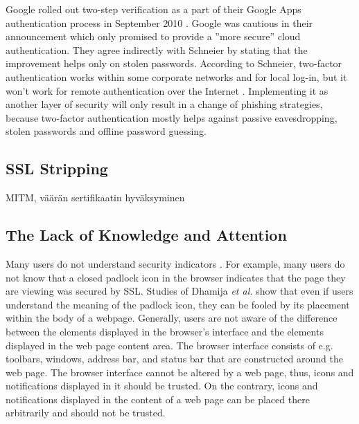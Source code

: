 \documentclass[english,gradu]{tktltiki}
\begin{document}
             Google rolled out two-step verification as a part of their Google Apps authentication process in September 2010 \cite{google_2step_2010}. Google was cautious in their announcement which only promised to provide a ''more secure'' cloud authentication. They agree indirectly with Schneier \cite{schneier_2factor_2005} by stating that the improvement helps only on stolen passwords. According to Schneier, two-factor authentication works within some corporate networks and for local log-in, but it won't work for remote authentication over the Internet \cite{schneier_2factor_2005}. Implementing it as another layer of security will only result in a change of phishing strategies, because two-factor authentication mostly helps against passive eavesdropping, stolen passwords and offline password guessing.



\subsection{SSL Stripping} %
\label{sub:ssl_stripping}
MITM, väärän sertifikaatin hyväksyminen


\subsection{The Lack of Knowledge and Attention} %
\label{sub:the_lack_of_knowledge_and_attention}

              Many users do not understand security indicators \cite{why_phishing_works_06}. For example, many users do not know that a closed padlock icon in the browser indicates that the page they are viewing was secured by SSL. Studies of Dhamija \emph{et al.} \cite{why_phishing_works_06} show that even if users understand the meaning of the padlock icon, they can be fooled by its placement within the body of a webpage. Generally, users are not aware of the difference between the elements displayed in the browser's interface and the elements displayed in the web page content area. The browser interface consists of e.g. toolbars, windows, address bar, and status bar that are constructed around the web page. The browser interface cannot be altered by a web page, thus, icons and notifications displayed in it should be trusted. On the contrary, icons and notifications displayed in the content of a web page can be placed there arbitrarily and should not be trusted.
\end{document}
